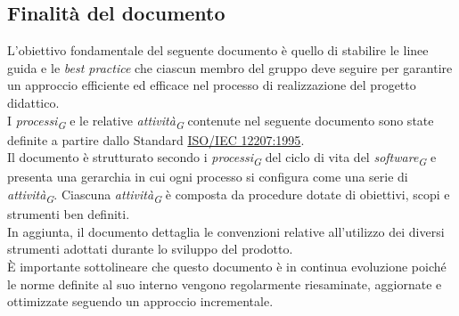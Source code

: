 \subsection{Finalità del documento}
L'obiettivo fondamentale del seguente documento è quello di stabilire le linee guida e le \textit{best practice} che ciascun membro del gruppo deve seguire per garantire un approccio efficiente ed efficace nel processo di realizzazione del progetto didattico.\\
I \textit{processi}\textsubscript{\textit{G}} e le relative \textit{attività}\textsubscript{\textit{G}} contenute nel seguente documento sono state definite a partire dallo Standard \href{https://www.math.unipd.it/~tullio/IS-1/2009/Approfondimenti/ISO_12207-1995.pdf}{ISO/IEC 12207:1995}.\\
Il documento è strutturato secondo i \textit{processi}\textsubscript{\textit{G}} del ciclo di vita del \textit{software}\textsubscript{\textit{G}} e presenta una gerarchia in cui ogni processo si configura come una serie di \textit{attività}\textsubscript{\textit{G}}. Ciascuna \textit{attività}\textsubscript{\textit{G}} è composta da procedure dotate di obiettivi, scopi e strumenti ben definiti.\\
In aggiunta, il documento dettaglia le convenzioni relative all'utilizzo dei diversi strumenti adottati durante lo sviluppo del prodotto.\\
È importante sottolineare che questo documento è in continua evoluzione poiché le norme definite al suo interno vengono regolarmente riesaminate, aggiornate e ottimizzate seguendo un approccio incrementale.\\
